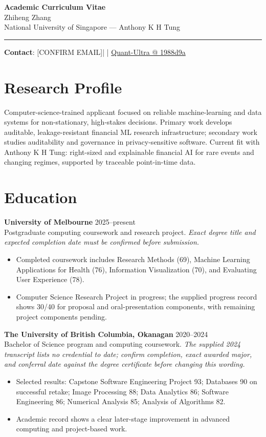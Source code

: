 \documentclass[11pt]{article}
\makeatletter
\newcommand{\ApplicantName}{Zhiheng Zhang}
\newcommand{\ApplicantEmail}{[CONFIRM EMAIL]}
\newcommand{\ApplicantPhone}{[CONFIRM PHONE]}
\newcommand{\ApplicantGitHub}{\href{https://github.com/zhiheng-zhang-Mera/Quant-Ultra/tree/1988d9a8530da91a8158de864d098ea869098923}{Quant-Ultra @ 1988d9a}}
\makeatother
\begin{document}
\begin{center}
{\LARGE\bfseries Academic Curriculum Vitae}\\[0.25em]
{\large \ApplicantName}\\
National University of Singapore --- Anthony K H Tung
\end{center}
\vspace{0.35em}\hrule\vspace{0.65em}

\textbf{Contact}: \ApplicantEmail\quad | \quad \ApplicantPhone\quad | \quad \ApplicantGitHub

\section*{Research Profile}
Computer-science-trained applicant focused on reliable machine-learning and data systems for non-stationary, high-stakes decisions. Primary work develops auditable, leakage-resistant financial ML research infrastructure; secondary work studies auditability and governance in privacy-sensitive software. Current fit with Anthony K H Tung: right-sized and explainable financial AI for rare events and changing regimes, supported by traceable point-in-time data.

\section*{Education}
\textbf{University of Melbourne} \hfill 2025--present\\
Postgraduate computing coursework and research project. \textit{Exact degree title and expected completion date must be confirmed before submission.}
\begin{itemize}
\item Completed coursework includes Research Methods (69), Machine Learning Applications for Health (76), Information Visualization (70), and Evaluating User Experience (78).
\item Computer Science Research Project in progress; the supplied progress record shows 30/40 for proposal and oral-presentation components, with remaining project components pending.
\end{itemize}

\textbf{The University of British Columbia, Okanagan} \hfill 2020--2024\\
Bachelor of Science program and computing coursework. \textit{The supplied 2024 transcript lists no credential to date; confirm completion, exact awarded major, and conferral date against the degree certificate before changing this wording.}
\begin{itemize}
\item Selected results: Capstone Software Engineering Project 93; Databases 90 on successful retake; Image Processing 88; Data Analytics 86; Software Engineering 86; Numerical Analysis 85; Analysis of Algorithms 82.
\item Academic record shows a clear later-stage improvement in advanced computing and project-based work.
\end{itemize}
\end{document}
